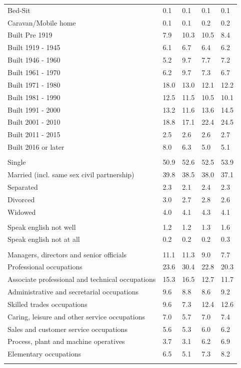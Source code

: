 \documentclass{article}
\begin{document}
\begin{table}[h]
\begin{tabular}{KTTTT}
Bed-Sit & 0.1& 0.1& 0.1& 0.1\\
Caravan/Mobile home & 0.1& 0.1& 0.2& 0.2\\
    \hline
Built Pre 1919 &  7.9& 10.3& 10.5&  8.4\\
Built 1919 - 1945 & 6.1& 6.7& 6.4& 6.2\\
Built  1946 - 1960 & 5.2& 9.7& 7.7& 7.2\\
Built  1961 - 1970 & 6.2& 9.7& 7.3& 6.7\\
Built  1971 - 1980 & 18.0& 13.0& 12.1& 12.2\\
Built  1981 - 1990 & 12.5& 11.5& 10.5& 10.1\\
Built  1991 - 2000 & 13.2& 11.6& 13.6& 14.5\\
Built  2001 - 2010 & 18.8& 17.1& 22.4& 24.5\\
Built  2011 - 2015 & 2.5& 2.6& 2.6& 2.7\\
Built  2016 or later & 8.0& 6.3& 5.0& 5.1\\
\hline
    \\
    \hline
Single & 50.9& 52.6& 52.5& 53.9\\
Married (incl. same sex civil partnership) & 39.8& 38.5& 38.0& 37.1\\
Separated  & 2.3& 2.1& 2.4& 2.3\\
Divorced  & 3.0& 2.7& 2.8& 2.6\\
Widowed & 4.0& 4.1& 4.3& 4.1\\
\hline
    \\ 
    \hline
Speak english not well & 1.2& 1.2& 1.3& 1.6\\
Speak english not at all & 0.2& 0.2& 0.2& 0.3\\
\hline
    \\
    \hline
Managers, directors and senior officials & 11.1& 11.3&  9.0&  7.7\\
Professional occupations & 23.6& 30.4& 22.8& 20.3\\
Associate professional and technical occupations & 15.3& 16.5& 12.7& 11.7\\
Administrative and secretarial occupations & 9.6& 8.8& 8.6& 9.2\\
Skilled trades occupations &  9.6&  7.3& 12.4& 12.6\\
Caring, leisure and other service occupations & 7.0& 5.7& 7.0& 7.4\\
Sales and customer service occupations & 5.6& 5.3& 6.0& 6.2\\
Process, plant and machine operatives & 3.7& 3.1& 6.2& 6.9\\
Elementary occupations & 6.5& 5.1& 7.3& 8.2\\
\hline
\end{tabular}
\end{table}
\end{document}
